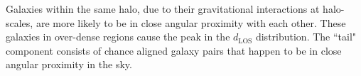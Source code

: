                                                                                                                                                             Galaxies within the same halo, due to their gravitational interactions at halo-scales, 
                                                                                                                                                            are more likely to be in close angular proximity with each other. These galaxies in 
                                                                                                                                                            over-dense regions cause the peak in the $d_{\mathrm{LOS}}$ distribution. The ``tail" 
                                                                                                                                                            component consists of chance aligned galaxy pairs that happen to be in close angular 
                                                                                                                                                            proximity in the sky. 

